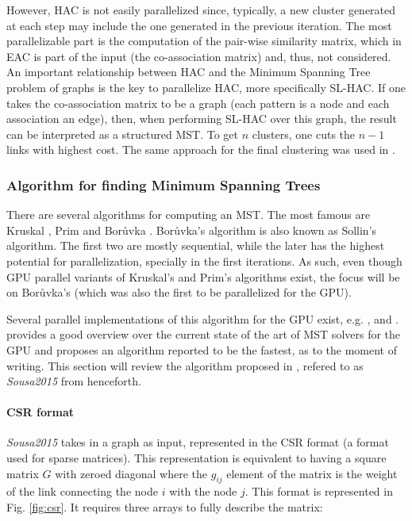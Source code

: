 However, HAC is not easily parallelized since, typically, a new cluster generated at each step may include the one generated in the previous iteration.
The most parallelizable part is the computation of the pair-wise similarity matrix, which in EAC is part of the input (the co-association matrix) and, thus, not considered.
An important relationship between HAC and the Minimum Spanning Tree problem of graphs is the key to parallelize HAC, more specifically SL-HAC.
If one takes the co-association matrix to be a graph (each pattern is a node and each association an edge), then, when performing SL-HAC over this graph, the result can be interpreted as a structured MST. To get $n$ clusters, one cuts the $n-1$ links with highest cost. The same approach for the final clustering was used in \cite{Fred2002}.

\subsubsection{Algorithm for finding Minimum Spanning Trees}
There are several algorithms for computing an MST. The most famous are Kruskal \citep{kruskal1956shortest}, Prim \citep{prim1957shortest} and Borůvka \citep{boruuvka1926jistem}. Borůvka's algorithm is also known as Sollin's algorithm.
The first two are mostly sequential, while the later has the highest potential for parallelization, specially in the first iterations.
As such, even though GPU parallel variants of Kruskal's \citep{rostrup2013fast} and Prim's \citep{wang2011design} algorithms exist, the focus will be on Borůvka's (which was also the first to be parallelized for the GPU).

Several parallel implementations of this algorithm for the GPU exist, e.g. \citep{Vineet2009}, \cite{harish2009large} and \citep{Sousa2015}. \citet{Sousa2015} provides a good overview over the current state of the art of MST solvers for the GPU and proposes an algorithm reported to be the fastest, as to the moment of writing. This section will review the algorithm proposed in \citep{Sousa2015}, refered to as \emph{Sousa2015} from henceforth.

\paragraph{CSR format}
\emph{Sousa2015} takes in a graph as input, represented in the CSR format (a format used for sparse matrices). This representation is equivalent to having a square matrix $G$ with zeroed diagonal where the $g_{ij}$ element of the matrix is the weight of the link connecting the node $i$ with the node $j$. This format is represented in Fig. \ref{fig:csr}. It requires three arrays to fully describe the matrix:

